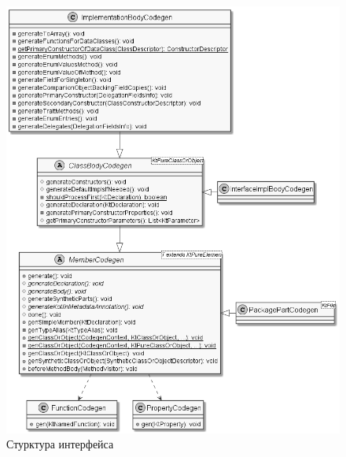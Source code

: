 \begin{figure}[htbp]
    \centering
    \includegraphics[width=\textwidth]{resources/06/06_member_codegen.png}
    \caption{Стурктура интерфейса }
    \label{fig05:binding-trace-scheme}
\end{figure}

